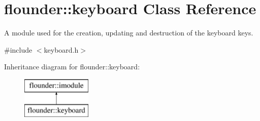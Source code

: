 \hypertarget{classflounder_1_1keyboard}{}\section{flounder\+:\+:keyboard Class Reference}
\label{classflounder_1_1keyboard}


A module used for the creation, updating and destruction of the keyboard keys.  




{\ttfamily \#include $<$keyboard.\+h$>$}

Inheritance diagram for flounder\+:\+:keyboard\+:\begin{figure}[H]
\begin{center}
\leavevmode
\includegraphics[height=2.000000cm]{classflounder_1_1keyboard}
\end{center}
\end{figure}
